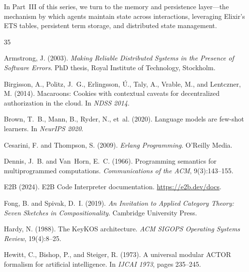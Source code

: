 \documentclass[12pt,a4paper]{article}
\theoremstyle{plain}
\theoremstyle{definition}
\begin{document}
In Part~III of this series, we turn to the memory and persistence layer---the mechanism by which agents maintain state across interactions, leveraging Elixir's ETS tables, persistent term storage, and distributed state management.


\newpage


\begin{thebibliography}{35}

Armstrong, J. (2003).
\newblock \emph{Making Reliable Distributed Systems in the Presence of Software Errors}.
\newblock PhD thesis, Royal Institute of Technology, Stockholm.

Birgisson, A., Politz, J.~G., Erlingsson, \'{U}., Taly, A., Vrable, M., and Lentczner, M. (2014).
\newblock Macaroons: Cookies with contextual caveats for decentralized authorization in the cloud.
\newblock In \emph{NDSS 2014}.

Brown, T.~B., Mann, B., Ryder, N., et~al. (2020).
\newblock Language models are few-shot learners.
\newblock In \emph{NeurIPS 2020}.

Cesarini, F. and Thompson, S. (2009).
\newblock \emph{Erlang Programming}.
\newblock O'Reilly Media.

Dennis, J.~B. and Van~Horn, E.~C. (1966).
\newblock Programming semantics for multiprogrammed computations.
\newblock \emph{Communications of the ACM}, 9(3):143--155.

E2B (2024).
\newblock E2B Code Interpreter documentation.
\newblock \url{https://e2b.dev/docs}.

Fong, B. and Spivak, D.~I. (2019).
\newblock \emph{An Invitation to Applied Category Theory: Seven Sketches in Compositionality}.
\newblock Cambridge University Press.

Hardy, N. (1988).
\newblock The KeyKOS architecture.
\newblock \emph{ACM SIGOPS Operating Systems Review}, 19(4):8--25.

Hewitt, C., Bishop, P., and Steiger, R. (1973).
\newblock A universal modular ACTOR formalism for artificial intelligence.
\newblock In \emph{IJCAI 1973}, pages 235--245.


\end{thebibliography}
\end{document}
